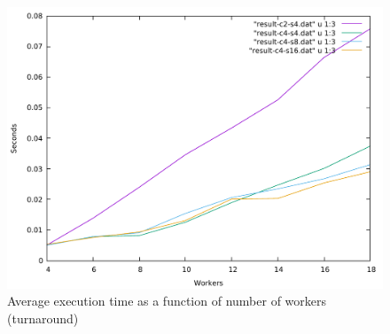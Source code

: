 \documentclass[journal]{IEEEtran}
\begin{document}
\begin{figure}[h]
	\centering
	\includegraphics[width=\textwidth]{compare-avg}
	\caption{Average execution time as a function of number of workers (turnaround)}
	\label{fig:total}
\end{figure}

\printbibliography

%
%
\end{document}
